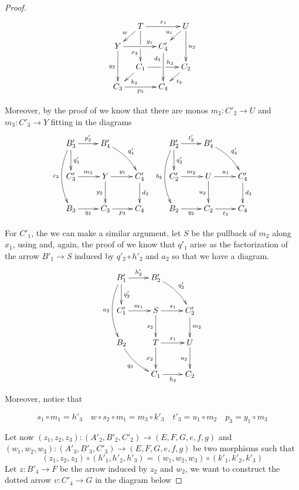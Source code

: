 \begin{proof}
\[\xymatrix@C=10pt@R=10pt{&T\ar[dd]|\hole_(.65){x_2}\ar[rr]^{x_1} \ar[dl]_{w} && U \ar[dd]^{u_2} \ar[dl]_{u_1} \\ Y  \ar[dd]_{y_2}\ar[rr]^(.7){y_1} & & C'_4 \ar[dd]_(.3){d_3}\\&C_1\ar[rr]|\hole^(.65){h_3} \ar[dl]^{k_3} && C_2 \ar[dl]^{t_3} \\C_3 \ar[rr]_{p_3} & & C_4}\]

Moreover, by the proof of  we know that there are monos $m_2\colon C'_2\to U $ and $m_3\colon C'_3\to Y$ fitting in the diagrams
\[\xymatrix{B'_3\ar[r]^{p'_2} \ar[d]^{q'_3} \ar@/_.4cm/[dd]_{c_2}& B'_4\ar@/^.2cm/[dr]^{q'_4} && B'_2 \ar@/_.4cm/[dd]_{b_2} \ar[r]^{t'_2} \ar[d]^{q'_2}& B'_4 \ar@/^.2cm/[dr]^{q'_4} \\C'_3  \ar[r]^{m_3}& Y \ar[r]^{y_1} \ar[d]_{y_2} & C'_4 \ar[d]^{d_3} &C'_2 \ar[r]^{m_2}& U\ar[r]^{u_1} \ar[d]_{u_2} & C'_4 \ar[d]^{d_3}\\  B_3  \ar[r]_{q_2}& C_3 \ar[r]_{p_3}& C_4 &B_2 \ar[r]_{q_2}&  C_2 \ar[r]_{t_3}& C_4}\]

For $C'_1$, the we can make a similar argument, let $S$ be the pullback of $m_2$ along $x_1$, using  and, again, the proof of  we know that $q'_1$ arise as the factorization of the arrow $B'_1\to S$ induced by $q'_2\circ h'_2$ and $a_2$ so that we have a diagram.
	\[\xymatrix{ B'_1 \ar@/_.4cm/[dd]_{a_2} \ar[r]^{h'_2} \ar[d]^{q'_2}& B'_2 \ar@/^.2cm/[dr]^{q'_2} \\C'_1 \ar[r]^{m_1}& S\ar[r]^{s_1} \ar[d]_{s_2}&C'_2 \ar[d]^{m_2}\\  B_2 \ar@/_.2cm/[dr]_{q_2}&  T \ar[r]^{x_1} \ar[d]_{x_2}& U \ar[d]_{u_2} \\ & C_1 \ar[r]_{h_3}&  C_2}\]

Moreover, notice that 

\[s_1\circ m_1 = h'_3 \quad w\circ s_2\circ m_1=  m_3\circ k'_3 \quad t'_3=u_1\circ m_2 \quad p_3=y_1\circ m_3\]

Let now $(z_1, z_2, z_3)\colon (A'_2, B'_2, C'_2)\to (E, F, G, e, f, g)$ and $(w_1, w_2, w_3)\colon (A'_3, B'_3, C'_3)\to (E, F, G, e, f, g)$ be two morphisms such that 
\[(z_1, z_2, z_3)\circ (h'_1, h'_2, h'_3)=(w_1, w_2, w_3)\circ (k'_1, k'_2, k'_3)\] 
Let $z\colon B'_4\to F$ be the arrow induced by $z_2$ and $w_2$, we want to construct the dotted arrow $v\colon C'_4 \to G$ in the diagram below
 

\end{proof}
